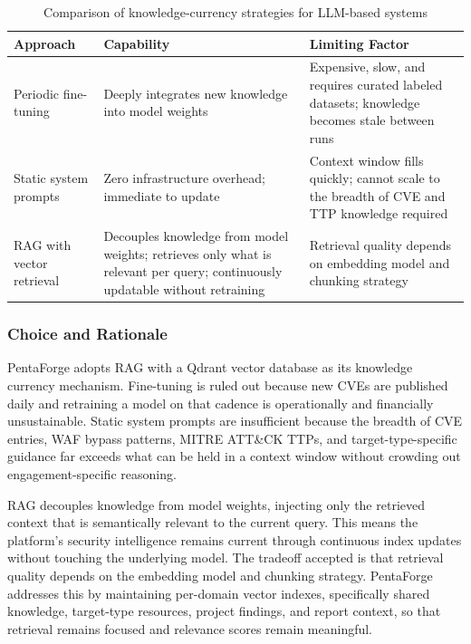 \documentclass[12pt,a4paper]{report}
\begin{document}
\begin{table}[H]
    \centering
    \renewcommand{\arraystretch}{1.35}
    \begin{tabular}{|p{}|p{}|p{}|}
        \hline
        \textbf{Approach} & \textbf{Capability} & \textbf{Limiting Factor} \\
        \hline
        Periodic fine-tuning & Deeply integrates new knowledge into model
        weights & Expensive, slow, and requires curated labeled datasets;
        knowledge becomes stale between runs \\
        \hline
        Static system prompts & Zero infrastructure overhead; immediate to
        update & Context window fills quickly; cannot scale to the breadth
        of CVE and TTP knowledge required \\
        \hline
        RAG with vector retrieval & Decouples knowledge from model weights;
        retrieves only what is relevant per query; continuously updatable
        without retraining & Retrieval quality depends on embedding model
        and chunking strategy \\
        \hline
    \end{tabular}
    \caption{Comparison of knowledge-currency strategies for LLM-based systems}
    \label{tab:rag_approaches}
\end{table}

\subsubsection{Choice and Rationale}

PentaForge adopts RAG with a Qdrant vector database as its knowledge
currency mechanism. Fine-tuning is ruled out because new CVEs are published
daily and retraining a model on that cadence is operationally and
financially unsustainable. Static system prompts are insufficient because
the breadth of CVE entries, WAF bypass patterns, MITRE ATT\&CK TTPs, and
target-type-specific guidance far exceeds what can be held in a context
window without crowding out engagement-specific reasoning.

RAG decouples knowledge from model weights, injecting only the retrieved
context that is semantically relevant to the current query. This means the
platform's security intelligence remains current through continuous index
updates without touching the underlying model. The tradeoff accepted is
that retrieval quality depends on the embedding model and chunking strategy.
PentaForge addresses this by maintaining per-domain vector indexes, specifically
shared knowledge, target-type resources, project findings, and report
context, so that retrieval remains focused and relevance scores remain
meaningful.
\end{document}
